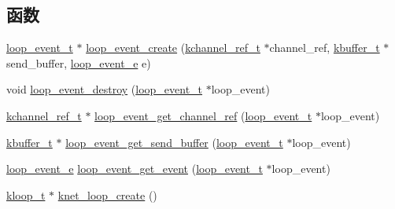 \subsection*{函数}
\begin{DoxyCompactItemize}
\item 
\hyperlink{a00071_a1095ee772017ce29dcac0987c456709e_a1095ee772017ce29dcac0987c456709e}{loop\+\_\+event\+\_\+t} $\ast$ \hyperlink{a00071_a28f7237bd68f7b5bc5b52c8842d57407_a28f7237bd68f7b5bc5b52c8842d57407}{loop\+\_\+event\+\_\+create} (\hyperlink{a00053_a3b7e82599367eade261456f60ebe2cd9_a3b7e82599367eade261456f60ebe2cd9}{kchannel\+\_\+ref\+\_\+t} $\ast$channel\+\_\+ref, \hyperlink{a00053_a4b09a7574cd440f9b94285ab73c81b4e_a4b09a7574cd440f9b94285ab73c81b4e}{kbuffer\+\_\+t} $\ast$send\+\_\+buffer, \hyperlink{a00071_ab92fe4e788615cfd56530167651a8ff4_ab92fe4e788615cfd56530167651a8ff4}{loop\+\_\+event\+\_\+e} e)
\item 
void \hyperlink{a00071_af79be13eb9a10b31227e808c44004f53_af79be13eb9a10b31227e808c44004f53}{loop\+\_\+event\+\_\+destroy} (\hyperlink{a00071_a1095ee772017ce29dcac0987c456709e_a1095ee772017ce29dcac0987c456709e}{loop\+\_\+event\+\_\+t} $\ast$loop\+\_\+event)
\item 
\hyperlink{a00053_a3b7e82599367eade261456f60ebe2cd9_a3b7e82599367eade261456f60ebe2cd9}{kchannel\+\_\+ref\+\_\+t} $\ast$ \hyperlink{a00071_a868256d58089c95006c0a0b051c34b12_a868256d58089c95006c0a0b051c34b12}{loop\+\_\+event\+\_\+get\+\_\+channel\+\_\+ref} (\hyperlink{a00071_a1095ee772017ce29dcac0987c456709e_a1095ee772017ce29dcac0987c456709e}{loop\+\_\+event\+\_\+t} $\ast$loop\+\_\+event)
\item 
\hyperlink{a00053_a4b09a7574cd440f9b94285ab73c81b4e_a4b09a7574cd440f9b94285ab73c81b4e}{kbuffer\+\_\+t} $\ast$ \hyperlink{a00071_a871ad74767d178e69c00583654f92e32_a871ad74767d178e69c00583654f92e32}{loop\+\_\+event\+\_\+get\+\_\+send\+\_\+buffer} (\hyperlink{a00071_a1095ee772017ce29dcac0987c456709e_a1095ee772017ce29dcac0987c456709e}{loop\+\_\+event\+\_\+t} $\ast$loop\+\_\+event)
\item 
\hyperlink{a00071_ab92fe4e788615cfd56530167651a8ff4_ab92fe4e788615cfd56530167651a8ff4}{loop\+\_\+event\+\_\+e} \hyperlink{a00071_ad74c97ed1010b1d0434269b5b01f5829_ad74c97ed1010b1d0434269b5b01f5829}{loop\+\_\+event\+\_\+get\+\_\+event} (\hyperlink{a00071_a1095ee772017ce29dcac0987c456709e_a1095ee772017ce29dcac0987c456709e}{loop\+\_\+event\+\_\+t} $\ast$loop\+\_\+event)
\item 
\hyperlink{a00053_a97fc76209a58362019f1ded9169e397f_a97fc76209a58362019f1ded9169e397f}{kloop\+\_\+t} $\ast$ \hyperlink{a00108_ga2e4181ebe9c1769be90bb8dc0e5cdffe_ga2e4181ebe9c1769be90bb8dc0e5cdffe}{knet\+\_\+loop\+\_\+create} ()

\end{DoxyCompactItemize}
